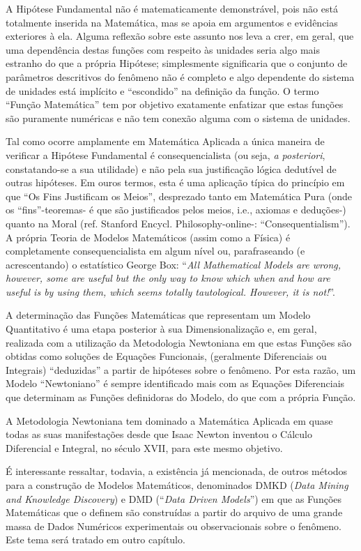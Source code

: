     A Hipótese Fundamental não é matematicamente demonstrável, pois não está totalmente inserida na Matemática, mas se apoia em argumentos e evidências exteriores à ela. Alguma reflexão sobre este assunto nos leva a crer, em geral, que uma dependência destas funções com respeito às unidades seria algo mais estranho do que a própria Hipótese; simplesmente significaria que o conjunto de parâmetros descritivos do fenômeno não é completo e algo dependente do sistema de unidades está implícito e ``escondido'' na definição da função. O termo ``Função Matemática'' tem por objetivo exatamente enfatizar que estas funções são puramente numéricas e não tem conexão alguma com o sistema de unidades.

    Tal como ocorre amplamente em Matemática Aplicada a única maneira de verificar a Hipótese Fundamental é consequencialista (ou seja, \textit{a posteriori}, constatando-se a sua utilidade) e não pela sua justificação lógica dedutível de outras hipóteses. Em ouros termos, esta é uma aplicação típica do princípio em que ``Os Fins Justificam os Meios'', desprezado tanto em Matemática Pura (onde os ``fins''-teoremas- é que são justificados pelos meios, i.e., axiomas e deduções-) quanto na Moral (ref. Stanford Encycl. Philosophy-online-: ``Consequentialism''). A própria Teoria de Modelos Matemáticos (assim como a Física) é completamente consequencialista em algum nível ou, parafraseando (e acrescentando) o estatístico George Box: ``\textit{All Mathematical Models are wrong, however, some are useful but the only way to know which when and how are useful is by using them, which seems totally tautological. However, it is not!}''.

    A determinação das Funções Matemáticas que representam um Modelo Quantitativo é uma etapa posterior à sua Dimensionalização e, em geral, realizada com a utilização da Metodologia Newtoniana em que estas Funções são obtidas como soluções de Equações Funcionais, (geralmente Diferenciais ou Integrais) ``deduzidas'' a partir de hipóteses sobre o fenômeno. Por esta razão, um Modelo ``Newtoniano'' é sempre identificado mais com as Equações Diferenciais que determinam as Funções definidoras do Modelo, do que com a própria Função.

    A Metodologia Newtoniana tem dominado a Matemática Aplicada em quase todas as suas manifestações desde que Isaac Newton inventou o Cálculo Diferencial e Integral, no século XVII, para este mesmo objetivo.

    É interessante ressaltar, todavia, a existência já mencionada, de outros métodos para a construção de Modelos Matemáticos, denominados DMKD (\textit{Data Mining and Knowledge Discovery}) e DMD (``\textit{Data Driven Models}'') em que as Funções Matemáticas que o definem são construídas a partir do arquivo de uma grande massa de Dados Numéricos experimentais ou observacionais sobre o fenômeno. Este tema será tratado em outro capítulo.

